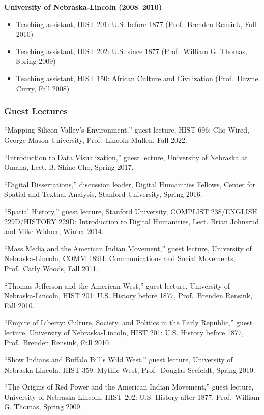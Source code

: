 \textbf{University of Nebraska-Lincoln (2008--2010)}

\begin{itemize}
\tightlist
\item
  Teaching assistant, HIST 201: U.S. before 1877 (Prof.~Brenden Rensink,
  Fall 2010)
\item
  Teaching assistant, HIST 202: U.S. since 1877 (Prof.~William G.
  Thomas, Spring 2009)
\item
  Teaching assistant, HIST 150: African Culture and Civilization
  (Prof.~Dawne Curry, Fall 2008)
\end{itemize}

\hypertarget{guest-lectures}{%
\subsubsection{Guest Lectures}\label{guest-lectures}}

``Mapping Silicon Valley's Environment,'' guest lecture, HIST 696: Clio
Wired, George Mason University, Prof.~Lincoln Mullen, Fall 2022.

``Introduction to Data Visualization,'' guest lecture, University of
Nebraska at Omaha, Lect. B. Shine Cho, Spring 2017.

``Digital Dissertations,'' discussion leader, Digital Humanities
Fellows, Center for Spatial and Textual Analysis, Stanford University,
Spring 2016.

``Spatial History,'' guest lecture, Stanford University, COMPLIST
238/ENGLISH 229D/HISTORY 229D: Introduction to Digital Humanities, Lect.
Brian Johnsrud and Mike Widner, Winter 2014.

``Mass Media and the American Indian Movement,'' guest lecture,
University of Nebraska-Lincoln, COMM 189H: Communications and Social
Movements, Prof.~Carly Woods, Fall 2011.

``Thomas Jefferson and the American West,'' guest lecture, University of
Nebraska-Lincoln, HIST 201: U.S. History before 1877, Prof.~Brenden
Rensink, Fall 2010.

``Empire of Liberty: Culture, Society, and Politics in the Early
Republic,'' guest lecture, University of Nebraska-Lincoln, HIST 201:
U.S. History before 1877, Prof.~Brenden Rensink, Fall 2010.

``Show Indians and Buffalo Bill's Wild West,'' guest lecture, University
of Nebraska-Lincoln, HIST 359: Mythic West, Prof.~Douglas Seefeldt,
Spring 2010.

``The Origins of Red Power and the American Indian Movement,'' guest
lecture, University of Nebraska-Lincoln, HIST 202: U.S. History after
1877, Prof.~William G. Thomas, Spring 2009.

